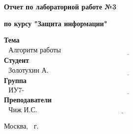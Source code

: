 \begin{center}
	\Large\textbf{Отчет по лабораторной работе №3}
	
	\Large\textbf {по курсу "Защита информации"}
\end{center}


\noindent\textbf{Тема} $\underline{\text{~~Алгоритм работы AES~~~~~~~~~~~~~~~~~~`~~~~~~~~~~~~~~~~~~~~~~~~~~~~~~~~~~~~~~~~~~~~~~~~~~~~~~~~~~~~~~~~~~~~}}$\newline\newline
\noindent\textbf{Студент} $\underline{\text{~~Золотухин А. В.~~~~~~~~~~~~~~~~~~~~~~~~~~~~~~~~~~~~~~~~~~~~~~~~~~~~~~~~~~~~~~~~~~~~~~~~~~~~~~~~~~~~~~~~~~}}$\newline\newline
\noindent\textbf{Группа} $\underline{\text{~~ИУ7-74Б~~~~~~~~~~~~~~~~~~~~~~~~~~~~~~~~~~~~~~~~~~~~~~~~~~~~~~~~~~~~~~~~~~~~~~~~~~~~~~~~~~~~~~~~~~~~~~~~~~~~~~}}$\newline\newline
\noindent\textbf{Преподаватели} $\underline{\text{~~Чиж И.С. ~~~~~~~~~~~~~~~~~~~~~~~~~~~~~~~~~~~~~~~~~~~~~~~~~~~~~~~~~~~~~~~~~~~~~~~~~~~~~~~~~~~~~~~~}}$\newline

\begin{center}
	\vfill
	Москва, \the\year
	~г.
\end{center}
\restoregeometry